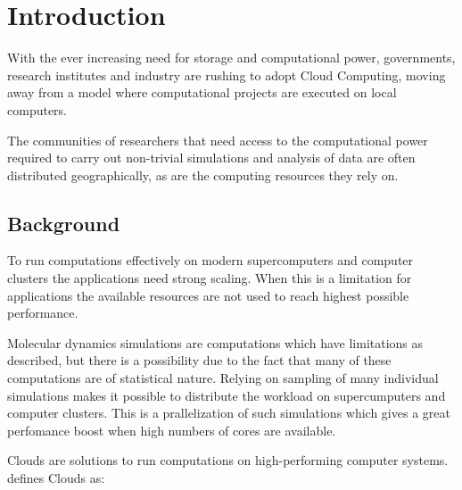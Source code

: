 \chapter{Introduction}
With the ever increasing need for storage and computational power,
governments, research institutes and industry are rushing to adopt
Cloud Computing, moving away from a model where computational projects
are executed on local computers.

The communities of researchers that need access to the computational
power required to carry out non-trivial simulations and analysis of
data are often distributed geographically, as are the computing
resources they rely on.



\section{Background}
To run computations effectively on modern supercomputers and computer
clusters the applications need strong scaling. When this is a
limitation for applications the available resources are not used to
reach highest possible performance.




Molecular dynamics simulations are computations which have limitations
as described, but there is a possibility due to the fact that many of
these computations are of statistical nature. Relying on sampling of
many individual simulations makes it possible to distribute the
workload on supercumputers and computer clusters. This is a
prallelization of such simulations which gives a great perfomance
boost when high numbers of cores are available.



Clouds are solutions to run computations on high-performing computer
systems. \cite{foster:2008} defines Clouds as:

